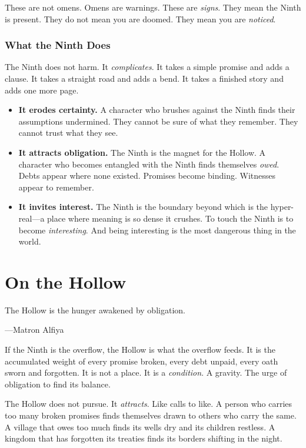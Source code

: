 \documentclass[11pt]{book}
\begin{document}
These are not omens. Omens are warnings. These are \textit{signs}. They mean the Ninth is present. They do not mean you are doomed. They mean you are \textit{noticed}.

\subsection{What the Ninth Does}

The Ninth does not harm. It \textit{complicates}. It takes a simple promise and adds a clause. It takes a straight road and adds a bend. It takes a finished story and adds one more page.

\begin{itemize}
  \item \textbf{It erodes certainty.} A character who brushes against the Ninth finds their assumptions undermined. They cannot be sure of what they remember. They cannot trust what they see.
  \item \textbf{It attracts obligation.} The Ninth is the magnet for the Hollow. A character who becomes entangled with the Ninth finds themselves \textit{owed}. Debts appear where none existed. Promises become binding. Witnesses appear to remember.
  \item \textbf{It invites interest.} The Ninth is the boundary beyond which is the hyper-real---a place where meaning is so dense it crushes. To touch the Ninth is to become \textit{interesting}. And being interesting is the most dangerous thing in the world.
\end{itemize}

\chapter{On the Hollow}

\epigraph{The Hollow is the hunger awakened by obligation.}{---Matron Alfiya}

If the Ninth is the overflow, the Hollow is what the overflow feeds. It is the accumulated weight of every promise broken, every debt unpaid, every oath sworn and forgotten. It is not a place. It is a \textit{condition}. A gravity. The urge of obligation to find its balance.

The Hollow does not pursue. It \textit{attracts}. Like calls to like. A person who carries too many broken promises finds themselves drawn to others who carry the same. A village that owes too much finds its wells dry and its children restless. A kingdom that has forgotten its treaties finds its borders shifting in the night.
\end{document}
